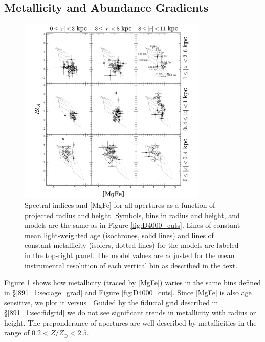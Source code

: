 \subsection{Metallicity and Abundance Gradients}
\begin{figure}
  \centering
  \includegraphics[width=0.8\textwidth]{891_1/figs/MgFe_multires.pdf}
  \caption[{[MgFe] vs \Hda in radius and height
    bins}]{\label{fig:MgFe_cuts}\fixspacing Spectral indices \Hda and
    [MgFe] for all apertures as a function of projected radius and
    height. Symbols, bins in radius and height, and models are the
    same as in Figure \ref{fig:D4000_cuts}. Lines of constant mean
    light-weighted age (isochrones, solid lines) and lines of constant
    metallicity (isofers, dotted lines) for the models are labeled in
    the top-right panel. The model values are adjusted for the mean
    instrumental resolution of each vertical bin as described in the
    text.}
\end{figure}

Figure \ref{fig:MgFe_cuts} shows how metallicity (traced by [MgFe])
varies in the same bins defined in \S\ref{891_1:sec:age_grad} and Figure
\ref{fig:D4000_cuts}. Since [MgFe] is also age sensitive, we plot it
versus \Hda.  Guided by the fiducial grid described in
\S\ref{891_1:sec:fidgrid} we do not see significant trends in metallicity
with radius or height. The preponderance of apertures are well
described by metallicities in the range of $0.2 < Z/Z_\odot < 2.5$.

